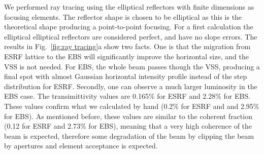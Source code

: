 \documentclass{iucr}              %
\newcommand{\inred}[1]{{\color{red}#1}}
\begin{document}


We performed ray tracing using the elliptical reflectors with finite dimensions as focusing elements. The reflector shape is chosen to be elliptical as this is the theoretical shape producing a point-to-point focusing. For a first calculation  the elliptical elliptical reflectors are considered perfect, and have no slope errors. 
The results in Fig.~\ref{fig:ray tracing}a show two facts. One is that the migration from ESRF lattice to the EBS will significantly improve the horizontal size, and the VSS is not needed. For EBS, the whole beam passes though the VSS, producing a final spot with almost Gaussian horizontal intensity profile instead of the step distribution for ESRF. Secondly, one can observe a much larger luminosity in the EBS case. The transimittivity values are 0.165\% for ESRF and 2.28\% for EBS. These values confirm what we calculated by hand (0.2\% for ESRF and and 2.95\% for EBS). As mentioned before, these values are similar to the coherent fraction \cite{coherentfraction} (0.12 for ESRF and 2.73\% for EBS), meaning that a very high coherence of the beam is expected, therefore some degradation of the beam by clipping the beam by apertures and element acceptance is expected. 
\end{document}
